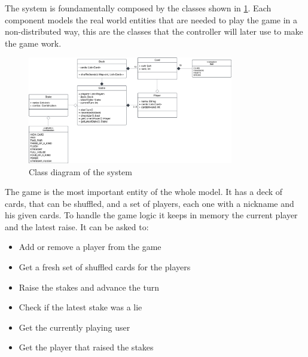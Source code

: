 \documentclass{scrartcl}
\begin{document}
The system is foundamentally composed by the classes shown in \cref{fig:classes}. \newline
Each component models the real world entities that are needed to play the game in a non-distributed
way, this are the classes that the controller will later use to make the game work.
\begin{figure}[H]
    \centering
    \includegraphics[width=0.8\textwidth]{figures/classes.png}
    \caption{Class diagram of the system}
    \label{fig:classes}
\end{figure}

The game is the most important entity of the whole model. It has a deck of cards, that can be shuffled,
and a set of players, each one with a nickname and his given cards.
To handle the game logic it keeps in memory the current player and the latest raise. \newline
It can be asked to:
\begin{itemize}
    \item Add or remove a player from the game
    \item Get a fresh set of shuffled cards for the players
    \item Raise the stakes and advance the turn
    \item Check if the latest stake was a lie
    \item Get the currently playing user
    \item Get the player that raised the stakes
\end{itemize}
\end{document}
